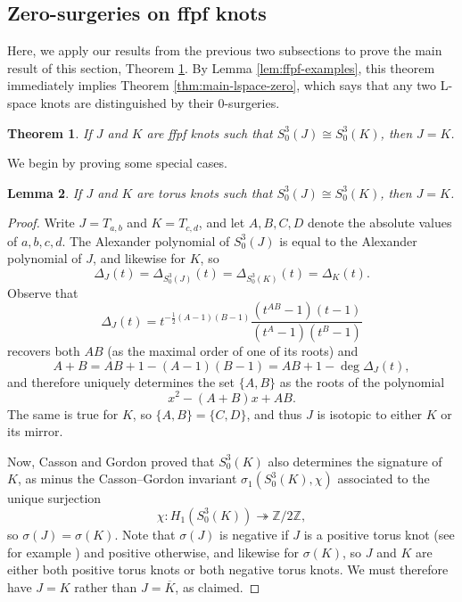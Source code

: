 \documentclass[11pt]{amsart}
\newtheorem {theorem}{Theorem}
\newtheorem {lemma}[theorem]{Lemma}
\numberwithin{equation}{section}
\numberwithin{theorem}{section}
\theoremstyle{definition}
\newcommand{\Z}{\mathbb{Z}}
\newcommand{\mirror}[1]{\overline{#1}}
\begin{document}
\subsection{Zero-surgeries on ffpf knots} Here, we apply our results  from the previous two subsections to prove the main result of this section, Theorem \ref{thm:zero-surgery-fpf}. By Lemma \ref{lem:ffpf-examples},  this theorem immediately implies Theorem \ref{thm:main-lspace-zero}, which says that any two L-space knots are distinguished by their $0$-surgeries.

\begin{theorem} \label{thm:zero-surgery-fpf}
If  $J$ and $ K$ are  ffpf knots such that $S^3_0(J) \cong S^3_0(K)$, then $J=K$.
\end{theorem}

We begin by proving some special cases.

\begin{lemma} \label{lem:torus-knots-different-0-surgery}
If $J$ and $K$ are torus knots such that $S^3_0(J) \cong S^3_0(K)$, then $J=K$.
\end{lemma}

\begin{proof}
Write $J = T_{a,b}$ and $K = T_{c,d}$, and let $A,B,C,D$ denote the absolute values of $a,b,c,d$.  The Alexander polynomial of $S^3_0(J)$ is equal to the Alexander polynomial of $J$, and likewise for $K$, so
\[ \Delta_J(t) = \Delta_{S^3_0(J)}(t) = \Delta_{S^3_0(K)}(t) = \Delta_K(t). \]
Observe that
\[ \Delta_J(t) = t^{-\frac{1}{2}(A-1)(B-1)} \frac{(t^{AB}-1)(t-1)}{(t^{A}-1)(t^{B}-1)} \]
recovers both $AB$ (as the maximal order of one of its roots) and
\[ A+B = AB + 1 - (A-1)(B-1) = AB+1 - \deg \Delta_{J}(t), \]
and therefore uniquely determines the set $\{A,B\}$ as the roots of the polynomial \[x^2-(A+B)x+AB.\]  The same is true for $K$, so $\{A,B\} = \{C,D\}$, and thus $J$ is isotopic to either $K$ or its mirror.

Now, Casson and Gordon \cite[Lemma~3.1]{casson-gordon} proved that $S^3_0(K)$ also determines the signature of $K$, as minus the Casson--Gordon invariant $\sigma_1(S^3_0(K),\chi)$ associated to the unique surjection \[\chi: H_1(S^3_0(K)) \twoheadrightarrow \Z/2\Z,\] so $\sigma(J) = \sigma(K)$.  Note that $\sigma(J)$ is negative if $J$ is a positive torus knot (see for example \cite{rudolph-signature}) and positive otherwise, and likewise for $\sigma(K)$, so $J$ and $K$ are either both positive torus knots or both negative torus knots.  We must therefore have $J=K$ rather than $J=\mirror{K}$, as claimed.
\end{proof}
\end{document}
